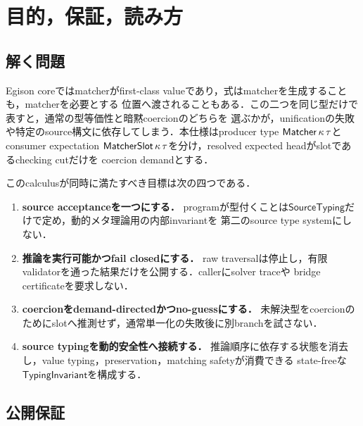 \section{目的，保証，読み方}

\subsection{解く問題}

Egison coreではmatcherがfirst-class valueであり，式はmatcherを生成することも，matcherを必要とする
位置へ渡されることもある．この二つを同じ型だけで表すと，通常の型等価性と暗黙coercionのどちらを
選ぶかが，unificationの失敗や特定のsource構文に依存してしまう．本仕様はproducer type
$\mathsf{Matcher}\,\kappa\,\tau$とconsumer expectation
$\mathsf{MatcherSlot}\,\kappa\,\tau$を分け，resolved expected headがslotであるchecking cutだけを
coercion demandとする．

このcalculusが同時に満たすべき目標は次の四つである．

\begin{enumerate}
\item \textbf{source acceptanceを一つにする．}
  programが型付くことは$\mathsf{SourceTyping}$だけで定め，動的メタ理論用の内部invariantを
  第二のsource type systemにしない．
\item \textbf{推論を実行可能かつfail closedにする．}
  raw traversalは停止し，有限validatorを通った結果だけを公開する．callerにsolver traceや
  bridge certificateを要求しない．
\item \textbf{coercionをdemand-directedかつno-guessにする．}
  未解決型をcoercionのためにslotへ推測せず，通常単一化の失敗後に別branchを試さない．
\item \textbf{source typingを動的安全性へ接続する．}
  推論順序に依存する状態を消去し，value typing，preservation，matching safetyが消費できる
  state-freeな$\mathsf{TypingInvariant}$を構成する．
\end{enumerate}

\subsection{公開保証}

